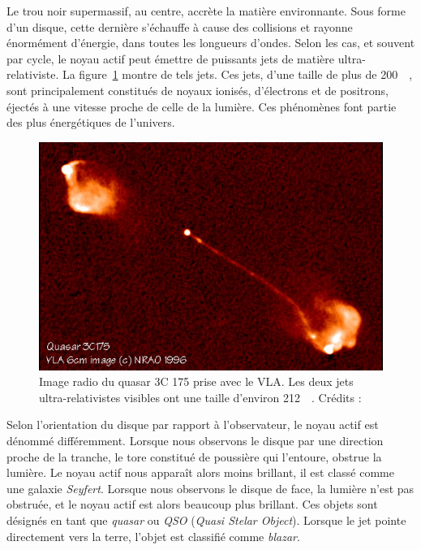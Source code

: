Le trou noir supermassif, au centre, accrète la matière environnante. Sous forme d'un disque, cette dernière s'échauffe à cause des collisions et rayonne énormément d'énergie, dans toutes les longueurs d'ondes. Selon les cas, et souvent par cycle, le noyau actif peut émettre de puissants jets de matière ultra-relativiste. La figure~\ref{fig:qso_jets} montre de tels jets. Ces jets, d'une taille de plus de \SI{200}{\perh\kpc}, sont principalement constitués de noyaux ionisés, d'électrons et de positrons, éjectés à une vitesse proche de celle de la lumière. Ces phénomènes font partie des plus énergétiques de l'univers.
\begin{figure}
  \centering
  \includegraphics[scale=0.4]{qso_jets}
  \caption{Image radio du quasar 3C 175 prise avec le VLA. Les deux jets ultra-relativistes visibles ont une taille d'environ \SI{212}{\perh\kpc}. Crédits : \textcite{Bridle1994}}
  \label{fig:qso_jets}
\end{figure}
Selon l'orientation du disque par rapport à l'observateur, le noyau actif est dénommé différemment. Lorsque nous observons le disque par une direction proche de la tranche, le tore constitué de poussière qui l'entoure, obstrue la lumière. Le noyau actif nous apparaît alors moins brillant, il est classé comme une galaxie \emph{Seyfert}. Lorsque nous observons le disque de face, la lumière n'est pas obstruée, et le noyau actif est alors beaucoup plus brillant. Ces objets sont désignés en tant que \emph{quasar} ou \emph{QSO} (\emph{Quasi Stelar Object}). Lorsque le jet pointe directement vers la terre, l'objet est classifié comme \emph{blazar}.

